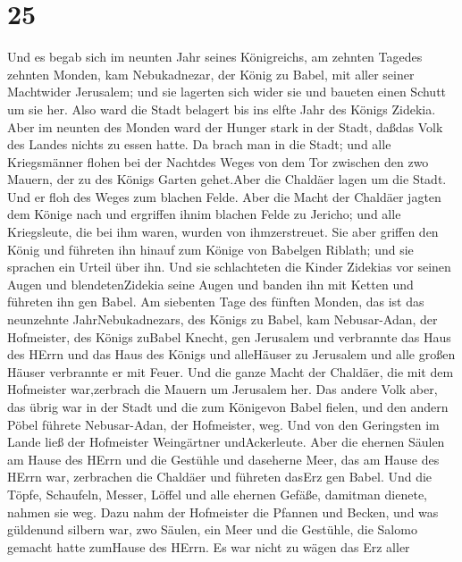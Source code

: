 \hypertarget{section-24}{%
\section{25}\label{section-24}}

 Und es begab sich im neunten Jahr seines Königreichs, am
zehnten Tagedes zehnten Monden, kam Nebukadnezar, der König zu Babel,
mit aller seiner Machtwider Jerusalem; und sie lagerten sich wider sie
und baueten einen Schutt um sie her.  Also ward die Stadt
belagert bis ins elfte Jahr des Königs Zidekia.  Aber im
neunten des Monden ward der Hunger stark in der Stadt, daßdas Volk des
Landes nichts zu essen hatte.  Da brach man in die Stadt;
und alle Kriegsmänner flohen bei der Nachtdes Weges von dem Tor zwischen
den zwo Mauern, der zu des Königs Garten gehet.Aber die Chaldäer lagen
um die Stadt. Und er floh des Weges zum blachen Felde.  Aber
die Macht der Chaldäer jagten dem Könige nach und ergriffen ihnim
blachen Felde zu Jericho; und alle Kriegsleute, die bei ihm waren,
wurden von ihmzerstreuet.  Sie aber griffen den König und
führeten ihn hinauf zum Könige von Babelgen Riblath; und sie sprachen
ein Urteil über ihn.  Und sie schlachteten die Kinder
Zidekias vor seinen Augen und blendetenZidekia seine Augen und banden
ihn mit Ketten und führeten ihn gen Babel.  Am siebenten
Tage des fünften Monden, das ist das neunzehnte JahrNebukadnezars, des
Königs zu Babel, kam Nebusar-Adan, der Hofmeister, des Königs zuBabel
Knecht, gen Jerusalem  und verbrannte das Haus des HErrn und
das Haus des Königs und alleHäuser zu Jerusalem und alle großen Häuser
verbrannte er mit Feuer.  Und die ganze Macht der Chaldäer,
die mit dem Hofmeister war,zerbrach die Mauern um Jerusalem her.
 Das andere Volk aber, das übrig war in der Stadt und die
zum Königevon Babel fielen, und den andern Pöbel führete Nebusar-Adan,
der Hofmeister, weg.  Und von den Geringsten im Lande ließ
der Hofmeister Weingärtner undAckerleute.  Aber die ehernen
Säulen am Hause des HErrn und die Gestühle und daseherne Meer, das am
Hause des HErrn war, zerbrachen die Chaldäer und führeten dasErz gen
Babel.  Und die Töpfe, Schaufeln, Messer, Löffel und alle
ehernen Gefäße, damitman dienete, nahmen sie weg.  Dazu
nahm der Hofmeister die Pfannen und Becken, und was güldenund silbern
war,  zwo Säulen, ein Meer und die Gestühle, die Salomo
gemacht hatte zumHause des HErrn. Es war nicht zu wägen das Erz aller
